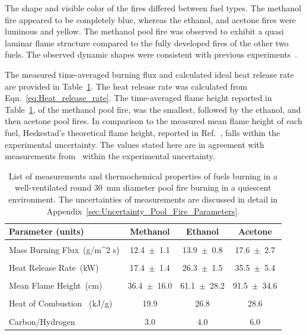 \documentclass[12pt]{article}
\begin{document}
The shape and visible color of the fires differed between fuel types. The methanol fire appeared to be completely blue, whereas the ethanol, and acetone fires were luminous and yellow. The methanol pool fire was observed to exhibit a quasi laminar flame structure compared to the fully developed fires of the other two fuels. The observed dynamic shapes were consistent with previous experiments~\cite{Hamins2016,Kim2019,Weckman1996,Hamins1994,Hamins1991,Lock2008,Hogben1998}.

The measured time-averaged burning flux and calculated ideal heat release rate are provided in Table~\ref{tab:Pool_Fire_Parameters_Table}. The heat release rate was calculated from Eqn.~\ref{eq:Heat_release_rate}. The time-averaged flame height reported in Table~\ref{tab:Pool_Fire_Parameters_Table}, of the methanol pool fire, was the smallest, followed by the ethanol, and then acetone pool fires. In comparison to the measured mean flame height of each fuel, Heskestad’s theoretical flame height, reported in Ref.~\cite{Heskestad1983}, falls within the experimental uncertainty. The values stated here are in agreement with measurements from~\cite{Kim2019} within the experimental uncertainty.
\begin{table}[!]
\caption{List of measurements and thermochemical properties of fuels burning in a well-ventilated round \SI{30}{mm} diameter pool fire burning in a quiescent environment. The uncertainties of measurements are discussed in detail in Appendix~\ref{sec:Uncertainty_Pool_Fire_Parameters}.}
\label{tab:Pool_Fire_Parameters_Table}
\centering
	\footnotesize
	\begin{tabular}{lccc}
\hline
\textbf{Parameter (units)} &\textbf{Methanol}& \textbf{Ethanol}& \textbf{Acetone}\\
\hline
\\[0.01cm]
Mass Burning Flux~(\si{g/{m^2 s}})		&	12.4~$\pm$~1.1		&	13.9~$\pm$~0.8	&	17.6~$\pm$~2.7\\
\\[0.01cm]
Heat Release Rate~(\si{kW})			&	17.4~$\pm$~1.4		&	26.3~$\pm$~1.5	&	35.5~$\pm$~5.4\\
\\[0.01cm]
Mean Flame Height~(\si{cm})			&	36.4~$\pm$~16.0		&	61.1~$\pm$~28.2	&	91.5~$\pm$~34.6\\
\\[0.01cm]
Heat of Combustion~ (\si{kJ/g})			&	19.9				&	26.8			&	28.6			\\	
\\[0.01cm]
Carbon/Hydrogen 					&	3.0				&	4.0			&	6.0			\\
\hline
\end{tabular}
\end{table}
\end{document}
